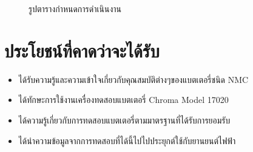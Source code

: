 \begin{center}
\begin{figure}[H]
	\caption{รูปตารางกำหนดการดำเนินงาน}
		\centering
		\captionsetup{justification=centering,margin=2cm}
	\end{figure}
\end{center}
\section{ประโยชน์ที่คาดว่าจะได้รับ}
\begin{itemize}
  \item ได้รับความรู้และความเข้าใจเกี่ยวกับคุณสมบัติต่างๆของแบตเตอรี่ชนิด NMC
  \item ได้ทักษะการใช้งานเครื่องทดสอบแบตเตอรี่ Chroma Model 17020
  \item ได้ความรู้เกี่ยวกับการทดสอบแบตเตอรี่ตามมาตรฐานที่ได้รับการยอมรับ
  \item ได้นำความข้อมูลจากการทดสอบที่ได้นี้ไปไปประยุกต์ใช้กับยานยนต์ไฟฟ้า
\end{itemize}


